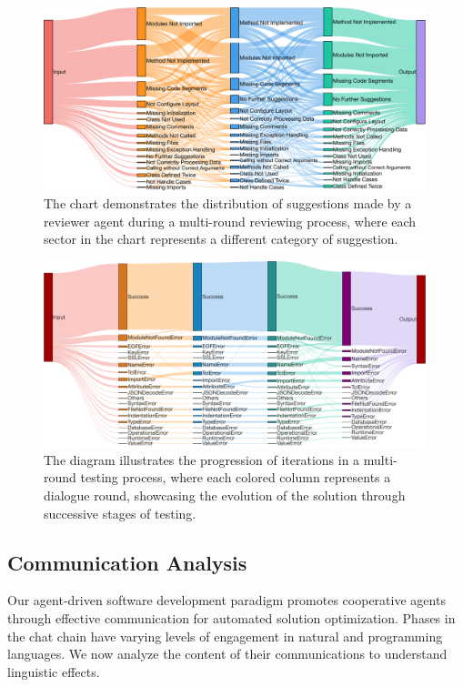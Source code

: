 \documentclass[11pt]{article}
\begin{document}
\begin{figure}[t]
    \centering
    \includegraphics[width=0.99\textwidth]{figs/reviewer_sankey.pdf}
    \caption{The chart demonstrates the distribution of suggestions made by a reviewer agent during a multi-round reviewing process, where each sector in the chart represents a different category of suggestion.}
    \label{fig:reviewer_sankey}
\end{figure}

\begin{figure}[t]
    \centering
    \includegraphics[width=0.99\textwidth]{figs/test_sankey.pdf}
    \caption{The diagram illustrates the progression of iterations in a multi-round testing process, where each colored column represents a dialogue round, showcasing the evolution of the solution through successive stages of testing.}
    \label{fig:test_sankey}
\end{figure}


\subsection{Communication Analysis}

Our agent-driven software development paradigm promotes cooperative agents through effective communication for automated solution optimization. Phases in the chat chain have varying levels of engagement in natural and programming languages. We now analyze the content of their communications to understand linguistic effects.
\end{document}
